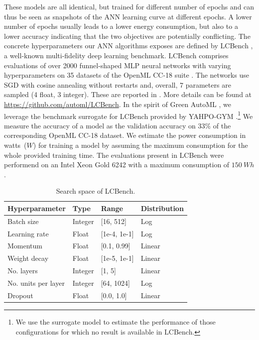 These models are all identical, but trained for different number of epochs and can thus be seen as snapshots of the ANN learning curve \cite{mohr-arxiv22a} at different epochs. A lower number of epochs usually leads to a lower energy consumption, but also to a lower accuracy indicating that the two objectives are potentially conflicting. The concrete hyperparameters our ANN algorithms exposes are defined by LCBench \cite{zimmer-tpami21a}, a well-known multi-fidelity deep learning benchmark.
LCBench comprises evaluations of over 2000 funnel-shaped MLP neural networks with varying hyperparameters on 35 datasets of the OpenML CC-18 suite \cite{bischl-arxiv17a}.
The networks use SGD with cosine annealing without restarts and, overall, $7$ parameters are sampled (4 float, 3 integer).
These are reported in .
More details can be found at \url{https://github.com/automl/LCBench}.
In the spirit of Green AutoML \cite{tornede-jair23a}, we leverage the benchmark surrogate for LCBench provided by YAHPO-GYM \cite{pfisterer-arxiv21a}.\footnote{We use the surrogate model to estimate the performance of those configurations for which no result is available in LCBench.} We measure the accuracy of a model as the validation accuracy on $33\%$ of the corresponding OpenML CC-18 dataset. We estimate the power consumption in watts~($W$) for training a model by assuming the maximum consumption for the whole provided training time. The evaluations present in LCBench were performend on an Intel Xeon Gold 6242 with a maximum consumption of $150~Wh$.

\begin{table}[t]
    \centering
    \begin{tabular}{@{}llll@{}}
    \toprule
    Hyperparameter & Type & Range & Distribution \\ \midrule
    Batch size & Integer & [16, 512] & Log \\
    Learning rate & Float & [1e-4, 1e-1] & Log \\
    Momentum & Float & [0.1, 0.99] & Linear \\
    Weight decay & Float & [1e-5, 1e-1] & Linear \\
    No. layers & Integer & [1, 5] & Linear \\
    No. units per layer & Integer & [64, 1024] & Log \\
    Dropout & Float & [0.0, 1.0] & Linear \\\bottomrule
    \end{tabular}
    \caption{Search space of LCBench.}
    \label{moo-tbl:lc_bench_space}
    \end{table}


